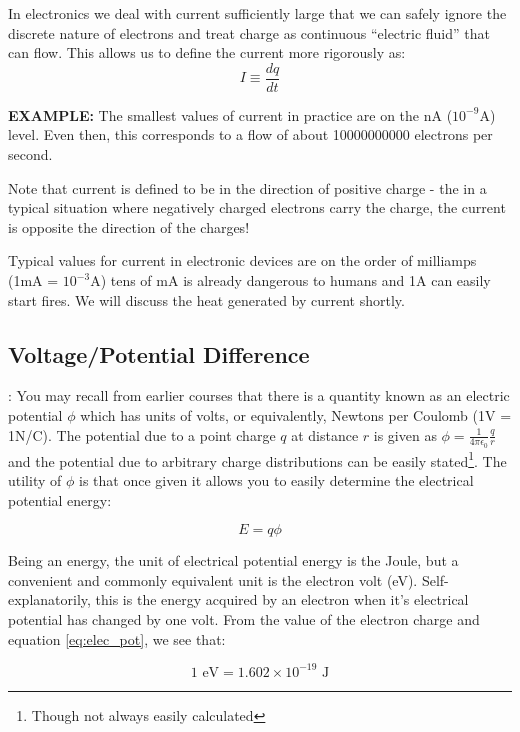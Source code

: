 \documentclass{tufte-book}
\begin{document}
In electronics we deal with current sufficiently large that we can safely ignore the discrete nature of electrons and treat charge as continuous ``electric fluid'' that can flow. This allows us to define the current more rigorously as:
\begin{equation}\label{eq:defn_current}
I \equiv \frac{dq}{dt}
\end{equation}

\textbf{EXAMPLE:} The smallest values of current in practice are on the nA ($10^{-9}$A) level. Even then, this corresponds to a flow of about 10000000000 electrons per second.

Note that current is defined to be in the direction of positive charge - the in a typical situation where negatively charged electrons carry the charge, the current is opposite the direction of the charges! 

Typical values for current in electronic devices are on the order of milliamps (1mA = $10^{-3}$A) tens of mA is already dangerous to humans and 1A can easily start fires. We will discuss the heat generated by current shortly. 

\subsection{Voltage/Potential Difference}: You may recall from earlier courses that there is a quantity known as an electric potential $\phi$ which has units  of volts, or equivalently, Newtons per Coulomb (1V = 1N/C). The potential due to a point charge $q$ at distance $r$ is given as $\phi = \frac{1}{4\pi\epsilon_0}\frac{q}{r}$ and the potential due to arbitrary charge distributions can be easily stated\footnote{Though not always easily calculated}. The utility of $\phi$ is that once given it allows you to easily determine the electrical potential energy:

\begin{equation}\label{eq:elec_pot}
E = q\phi
\end{equation}

Being an energy, the unit of electrical potential energy is the Joule, but a convenient and commonly equivalent unit is the electron volt (eV). Self-explanatorily, this is the energy acquired by an electron when it's electrical potential has changed by one volt. From the value of the electron charge and equation \ref{eq:elec_pot}, we see that:

\begin{equation}\label{eq:defn_eV}
1 \text{ eV} = 1.602\times10^{-19}\text{ J}
\end{equation}
\end{document}
